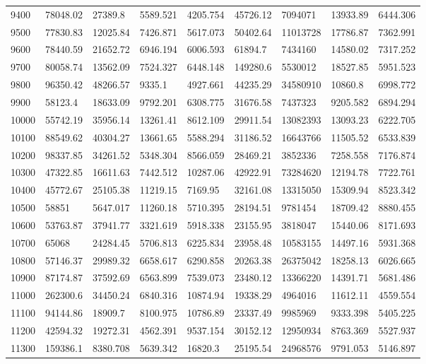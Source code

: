 \begin{table}[]
{\begin{tabular}{|l|l|l|l|l|l|l|l|l|}
9400 & 78048.02 & 27389.8 & 5589.521 & 4205.754 & 45726.12 & 7094071 & 13933.89 & 6444.306 \\
9500 & 77830.83 & 12025.84 & 7426.871 & 5617.073 & 50402.64 & 11013728 & 17786.87 & 7362.991 \\
9600 & 78440.59 & 21652.72 & 6946.194 & 6006.593 & 61894.7 & 7434160 & 14580.02 & 7317.252 \\
9700 & 80058.74 & 13562.09 & 7524.327 & 6448.148 & 149280.6 & 5530012 & 18527.85 & 5951.523 \\
9800 & 96350.42 & 48266.57 & 9335.1 & 4927.661 & 44235.29 & 34580910 & 10860.8 & 6998.772 \\
9900 & 58123.4 & 18633.09 & 9792.201 & 6308.775 & 31676.58 & 7437323 & 9205.582 & 6894.294 \\
10000 & 55742.19 & 35956.14 & 13261.41 & 8612.109 & 29911.54 & 13082393 & 13093.23 & 6222.705 \\
10100 & 88549.62 & 40304.27 & 13661.65 & 5588.294 & 31186.52 & 16643766 & 11505.52 & 6533.839 \\
10200 & 98337.85 & 34261.52 & 5348.304 & 8566.059 & 28469.21 & 3852336 & 7258.558 & 7176.874 \\
10300 & 47322.85 & 16611.63 & 7442.512 & 10287.06 & 42922.91 & 73284620 & 12194.78 & 7722.761 \\
10400 & 45772.67 & 25105.38 & 11219.15 & 7169.95 & 32161.08 & 13315050 & 15309.94 & 8523.342 \\
10500 & 58851 & 5647.017 & 11260.18 & 5710.395 & 28194.51 & 9781454 & 18709.42 & 8880.455 \\
10600 & 53763.87 & 37941.77 & 3321.619 & 5918.338 & 23155.95 & 3818047 & 15440.06 & 8171.693 \\
10700 & 65068 & 24284.45 & 5706.813 & 6225.834 & 23958.48 & 10583155 & 14497.16 & 5931.368 \\
10800 & 57146.37 & 29989.32 & 6658.617 & 6290.858 & 20263.38 & 26375042 & 18258.13 & 6026.665 \\
10900 & 87174.87 & 37592.69 & 6563.899 & 7539.073 & 23480.12 & 13366220 & 14391.71 & 5681.486 \\
11000 & 262300.6 & 34450.24 & 6840.316 & 10874.94 & 19338.29 & 4964016 & 11612.11 & 4559.554 \\
11100 & 94144.86 & 18909.7 & 8100.975 & 10786.89 & 23337.49 & 9985969 & 9333.398 & 5405.225 \\
11200 & 42594.32 & 19272.31 & 4562.391 & 9537.154 & 30152.12 & 12950934 & 8763.369 & 5527.937 \\
11300 & 159386.1 & 8380.708 & 5639.342 & 16820.3 & 25195.54 & 24968576 & 9791.053 & 5146.897 \\

\end{tabular}}
\end{table}
